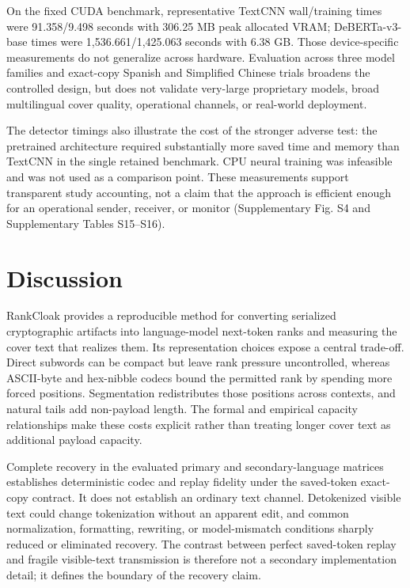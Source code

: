 \documentclass[fleqn,10pt]{wlscirep}
\begin{document}
On the fixed CUDA benchmark, representative TextCNN wall/training times were 91.358/9.498 seconds with 306.25 MB peak allocated VRAM; DeBERTa-v3-base times were 1,536.661/1,425.063 seconds with 6.38 GB. Those device-specific measurements do not generalize across hardware. Evaluation across three model families and exact-copy Spanish and Simplified Chinese trials broadens the controlled design, but does not validate very-large proprietary models, broad multilingual cover quality, operational channels, or real-world deployment.

The detector timings also illustrate the cost of the stronger adverse test: the pretrained architecture required substantially more saved time and memory than TextCNN in the single retained benchmark. CPU neural training was infeasible and was not used as a comparison point. These measurements support transparent study accounting, not a claim that the approach is efficient enough for an operational sender, receiver, or monitor (Supplementary Fig. S4 and Supplementary Tables S15--S16).

\section*{Discussion}\label{sec:discussion}

RankCloak provides a reproducible method for converting serialized cryptographic artifacts into language-model next-token ranks and measuring the cover text that realizes them. Its representation choices expose a central trade-off. Direct subwords can be compact but leave rank pressure uncontrolled, whereas ASCII-byte and hex-nibble codecs bound the permitted rank by spending more forced positions. Segmentation redistributes those positions across contexts, and natural tails add non-payload length. The formal and empirical capacity relationships make these costs explicit rather than treating longer cover text as additional payload capacity.

Complete recovery in the evaluated primary and secondary-language matrices establishes deterministic codec and replay fidelity under the saved-token exact-copy contract. It does not establish an ordinary text channel. Detokenized visible text could change tokenization without an apparent edit, and common normalization, formatting, rewriting, or model-mismatch conditions sharply reduced or eliminated recovery. The contrast between perfect saved-token replay and fragile visible-text transmission is therefore not a secondary implementation detail; it defines the boundary of the recovery claim.
\end{document}
